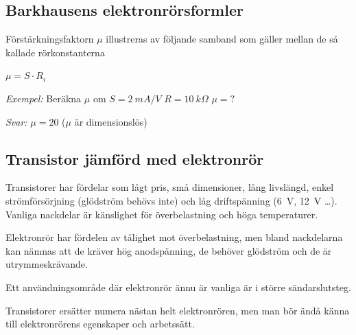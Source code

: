 \subsection{Barkhausens elektronrörsformler}

Förstärkningsfaktorn \(\mu \) illustreras av följande samband som gäller mellan de så kallade rörkonstanterna

\(\mu = S \cdot R_i\)

\emph{Exempel:}
Beräkna \(\mu\)  om \(S = 2\ mA/V\) \(R = 10\ k\Omega\) \(\mu = ?\)

\emph{Svar:} \(\mu = 20\) (\(\mu\)  är dimensionslös)

\subsection{Transistor jämförd med elektronrör}

Transistorer har fördelar som lågt pris, små dimensioner, lång livslängd, enkel strömförsörjning (glödström behövs inte) och låg driftspänning (6~V, 12~V \ldots ). Vanliga nackdelar är känslighet för
överbelastning och höga temperaturer.

Elektronrör har fördelen av tålighet mot överbelastning, men bland nackdelarna kan nämnas att de kräver hög anodspänning, de behöver glödström och de är utrymmeskrävande.

Ett användningsområde där elektronrör ännu är vanliga är i större sändarslutsteg.

Transistorer ersätter numera nästan helt elektronrören, men man bör ändå känna till elektronrörens egenskaper och arbetssätt.
